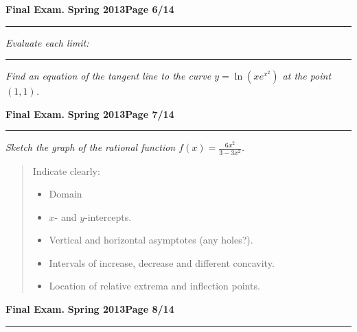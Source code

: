 \documentclass[12pt]{article}
\begin{document}
\newpage

\hfill{\large\bf Final Exam.}\hfill{\large\bf
  Spring 2013}\hfill{\large\bf Page 6/14}\hrule

\bigskip
{\problem[10 pts] \em  Evaluate each limit:} 

\bigskip
{}

\vspace{4cm}
\vspace{5cm}

\hrule
{\problem[10 pts] \em Find an equation of the tangent line to the
  curve $y=\ln(x e^{x^2})$ at the point $(1,1)$.} 
\newpage

\hfill{\large\bf Final Exam.}\hfill{\large\bf
  Spring 2013}\hfill{\large\bf Page 7/14}\hrule

\bigskip
{\problem[30 pts] \em Sketch the graph of the rational function $f(x)
  = \displaystyle{\frac{6x^2}{3-3x^2}}$.}
\begin{quotation}
Indicate clearly:
\begin{itemize}
\item Domain
\item $x$- and $y$-intercepts.
\item Vertical and horizontal asymptotes (any holes?).
\item Intervals of increase, decrease and different concavity.
\item Location of relative extrema and inflection points. 
\end{itemize}
\end{quotation}
\newpage

\hfill{\large\bf Final Exam.}\hfill{\large\bf
  Spring 2013}\hfill{\large\bf Page 8/14}\hrule
\end{document}

